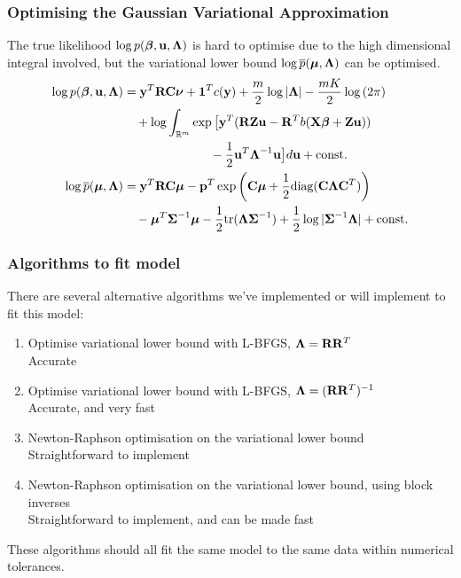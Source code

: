 \documentclass{beamer}
\begin{document}
\begin{frame}
\frametitle{Optimising the Gaussian Variational Approximation}
The true likelihood $\log p({\boldsymbol \beta}, {\bf u}, {\boldsymbol \Lambda})$ is hard to optimise due 
to the high dimensional integral involved, but the variational lower bound $\log \overline{p}({\boldsymbol \mu}, {\boldsymbol \Lambda})$ can be optimised.
\begin{align*}
\log p({\boldsymbol \beta}, {\bf u}, {\boldsymbol \Lambda}) &= {\bf y}^T {\bf R} {\bf C} {\boldsymbol \nu} + {\bf 1}^T c({\bf y}) + \frac{m}{2} \log |{\boldsymbol \Lambda}| - \frac{mK}{2} \log{(2 \pi)}\\
&\quad + \log  \int_{\mathbb{R}^{m}} \exp \big[ {\bf y}^T ({\bf R} {\bf Z} {\bf u} - {\bf R}^T b( {\bf X} {\boldsymbol \beta} + {\bf Z} {\bf u})) \\
 &\quad \quad \quad \quad \quad \quad \quad - {\frac{1}{2}} {{\bf u}^T {\boldsymbol \Lambda}^{-1} {\bf u} } \big] d {\bf u} + \text{const.}\\
\log \overline{p}({\boldsymbol \mu}, {\boldsymbol \Lambda}) &= {\bf y}^T {\bf R} {\bf C} {\boldsymbol \mu} - {\bf p}^T \exp{\left({\bf C}{\boldsymbol\mu}+ {\frac{1}{2}}\text{diag}{({\bf C}{\boldsymbol\Lambda}{\bf C}^T)}\right)} \\
& \quad - {\boldsymbol \mu}^T {\boldsymbol \Sigma}^{-1} {\boldsymbol \mu} - {\frac{1}{2}} \text{tr}{({\boldsymbol\Lambda}{\boldsymbol\Sigma}^{-1})} + {\frac{1}{2}} \log{|{\boldsymbol\Sigma}^{-1}{\boldsymbol\Lambda}|} + \text{const.} \\
\end{align*}
\end{frame}

\begin{frame}
\frametitle{Algorithms to fit model}
There are several alternative algorithms we've implemented or will implement
to fit this model:
\begin{enumerate}
\item Optimise variational lower bound with L-BFGS, ${\boldsymbol \Lambda} = {\bf R} {\bf R}^T$\\
\quad Accurate
\item Optimise variational lower bound with L-BFGS, ${\boldsymbol \Lambda} = ({\bf R} {\bf R}^T)^{-1}$ \\
\quad Accurate, and very fast
\item Newton-Raphson optimisation on the variational lower bound \\
\quad Straightforward to implement
\item Newton-Raphson optimisation on the variational lower bound, using block inverses \\
\quad Straightforward to implement, and can be made fast
\end{enumerate}

These algorithms should all fit the same model to the same data
within numerical tolerances.
\end{frame}
\end{document}
